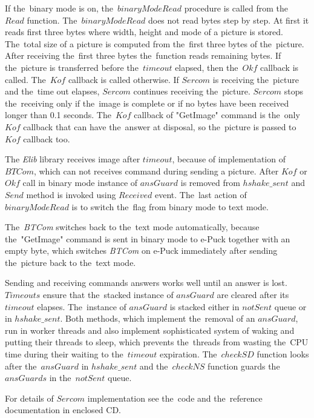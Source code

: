   If the~binary mode is on, the~$binaryModeRead$ procedure is called from
  the~$Read$ function. The~$binaryModeRead$ does not read bytes step by step.
  At first it reads first three bytes where width, height and mode of a picture is stored.
  The~total size of a picture is computed from the~first three bytes of the~picture.
  After receiving the~first three bytes the~function reads remaining bytes.
  If the~picture is transferred before the~$timeout$ elapsed, then the~$Okf$ callback is called.
  The~$Kof$ callback is called otherwise. 
  If $Sercom$ is receiving the~picture and the~time out elapses,
  $Sercom$ continues receiving the~picture. $Sercom$ stops the~receiving only if
  the~image is complete or if no bytes have been received longer than 0.1 seconds.
  The~$Kof$ callback of "GetImage" command is the~only $Kof$ callback 
  that can have the~answer at disposal, so the~picture is passed to $Kof$ callback too.	

  The {\it Elib} library receives image after $timeout$, because of implementation of~ $BTCom$,
  which can not receives command during sending a picture.
  After $Kof$ or $Okf$ call in binary mode instance of $ansGuard$ is removed from $hshake\_sent$ 
  and $Send$ method is invoked using $Received$ event.
  The~last action of $binaryModeRead$ is to switch the~flag from binary mode to text mode.
 
  \begin{remark}
  The~{\it BTCom} switches back to the~text mode automatically, because
  the~"GetImage" command is sent in binary mode to e-Puck together with an empty byte, which
  switches {\it BTCom} on e-Puck  immediately after sending the~picture back to the~text mode.
  \end{remark}

  Sending and receiving commands answers works well 
  until an answer is lost. $Timeouts$ ensure that the~stacked instance of $ansGuard$ are cleared after its $timeout$  elapses.
  The~instance of $ansGuard$ is stacked either in $notSent$ queue	or in $hshake\_sent$.
  Both methods, which implement the~removal of an $ansGuard$, run in worker threads and also implement
  sophisticated system of waking and putting their threads to sleep, which prevents the~threads from wasting
  the~CPU time during their waiting to the~$timeout$ expiration. 
  The~$checkSD$ function looks after the~$ansGuard$ in $hshake\_sent$ and the~$checkNS$ function guards
  the~$ansGuards$ in the~$notSent$ queue.

  \begin{remark}
  For details of $Sercom$ implementation see the~code 
  and the~reference documentation in enclosed CD.
  \end{remark}
  
